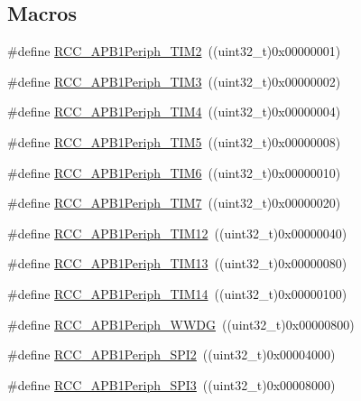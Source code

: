 \subsection*{Macros}
\begin{DoxyCompactItemize}
\item 
\#define \hyperlink{group___a_p_b1__peripheral_ga742bab2f04cebe587574b53f7107aeaf}{R\+C\+C\+\_\+\+A\+P\+B1\+Periph\+\_\+\+T\+I\+M2}~((uint32\+\_\+t)0x00000001)
\item 
\#define \hyperlink{group___a_p_b1__peripheral_gad4454f63a511a256e55aad55c03beb76}{R\+C\+C\+\_\+\+A\+P\+B1\+Periph\+\_\+\+T\+I\+M3}~((uint32\+\_\+t)0x00000002)
\item 
\#define \hyperlink{group___a_p_b1__peripheral_ga80f9f3720804a97210b723696bd94d83}{R\+C\+C\+\_\+\+A\+P\+B1\+Periph\+\_\+\+T\+I\+M4}~((uint32\+\_\+t)0x00000004)
\item 
\#define \hyperlink{group___a_p_b1__peripheral_ga4905c26000a571fa01fc057fe31d254a}{R\+C\+C\+\_\+\+A\+P\+B1\+Periph\+\_\+\+T\+I\+M5}~((uint32\+\_\+t)0x00000008)
\item 
\#define \hyperlink{group___a_p_b1__peripheral_ga4974e8b8f11d54fbc0bac1988ff6254c}{R\+C\+C\+\_\+\+A\+P\+B1\+Periph\+\_\+\+T\+I\+M6}~((uint32\+\_\+t)0x00000010)
\item 
\#define \hyperlink{group___a_p_b1__peripheral_ga9415b0c46db5318bdee3f868c16b8d35}{R\+C\+C\+\_\+\+A\+P\+B1\+Periph\+\_\+\+T\+I\+M7}~((uint32\+\_\+t)0x00000020)
\item 
\#define \hyperlink{group___a_p_b1__peripheral_ga0a4ec40233160ca20adaa571073e7bcd}{R\+C\+C\+\_\+\+A\+P\+B1\+Periph\+\_\+\+T\+I\+M12}~((uint32\+\_\+t)0x00000040)
\item 
\#define \hyperlink{group___a_p_b1__peripheral_ga34397b722f46f31e898136fb51a7523a}{R\+C\+C\+\_\+\+A\+P\+B1\+Periph\+\_\+\+T\+I\+M13}~((uint32\+\_\+t)0x00000080)
\item 
\#define \hyperlink{group___a_p_b1__peripheral_ga7100c45768eea1484f6fd519b53e287d}{R\+C\+C\+\_\+\+A\+P\+B1\+Periph\+\_\+\+T\+I\+M14}~((uint32\+\_\+t)0x00000100)
\item 
\#define \hyperlink{group___a_p_b1__peripheral_gad84e40be78ddc40b8eae1c2b0898f6b1}{R\+C\+C\+\_\+\+A\+P\+B1\+Periph\+\_\+\+W\+W\+DG}~((uint32\+\_\+t)0x00000800)
\item 
\#define \hyperlink{group___a_p_b1__peripheral_gaa21f1dfb4fcf241c6f85a048eaca29df}{R\+C\+C\+\_\+\+A\+P\+B1\+Periph\+\_\+\+S\+P\+I2}~((uint32\+\_\+t)0x00004000)
\item 
\#define \hyperlink{group___a_p_b1__peripheral_gabb0b40e839ef7403b086482e89d56f35}{R\+C\+C\+\_\+\+A\+P\+B1\+Periph\+\_\+\+S\+P\+I3}~((uint32\+\_\+t)0x00008000)

\end{DoxyCompactItemize}
